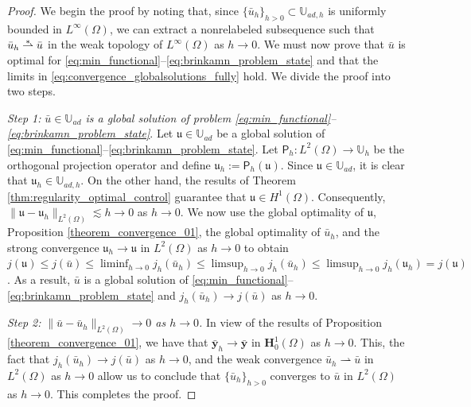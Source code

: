 \documentclass[final]{siamart0216}
\begin{document}
\begin{proof}
	We begin the proof by noting that, since $\{\bar{u}_{h}\}_{h>0}\subset \mathbb{U}_{ad,h}$ is uniformly bounded in $L^{\infty}(\Omega)$, we can extract a nonrelabeled subsequence such that $\bar{u}_{h}\mathrel{\ensurestackMath{\stackon[1pt]{\rightharpoonup}{\scriptstyle\ast}}}\bar{u}$ in the weak topology of $L^{\infty}(\Omega)$ as $h\rightarrow 0$. We must now prove that $\bar{u}$ is optimal for \eqref{eq:min_functional}--\eqref{eq:brinkamn_problem_state} and that the limits in \eqref{eq:convergence_globalsolutions_fully} hold. We divide the proof into two steps.
	
	\emph{Step 1:} \emph{$\bar{u}\in \mathbb{U}_{ad}$ is a global solution of problem \eqref{eq:min_functional}--\eqref{eq:brinkamn_problem_state}}. Let $\mathfrak{u}\in \mathbb{U}_{ad}$ be a global solution of \eqref{eq:min_functional}--\eqref{eq:brinkamn_problem_state}. Let $\mathsf{P}_h: L^2(\Omega)\to \mathbb{U}_h$ be the orthogonal projection operator and define $\mathfrak{u}_{h}:=\mathsf{P}_h(\mathfrak{u})$. Since $\mathfrak{u}\in \mathbb{U}_{ad}$, it is clear that $\mathfrak{u}_{h}\in \mathbb{U}_{ad,h}$. On the other hand, the results of Theorem \ref{thm:regularity_optimal_control} guarantee that 	$\mathfrak{u}\in H^1(\Omega)$. Consequently, $\|\mathfrak{u}-\mathfrak{u}_{h}\|_{L^2(\Omega)}\lesssim h \to 0$ as $h \rightarrow 0$. We now use the global optimality of $\mathfrak{u}$, Proposition \ref{theorem_convergence_01}, the global optimality of $\bar{u}_{h}$, and the strong convergence $\mathfrak{u}_{h}\to\mathfrak{u}$ in $L^2(\Omega)$ as $h \rightarrow 0$ to obtain $j(\mathfrak{u})\leq j(\bar{u})\leq \liminf_{h\to 0} j_h (\bar{u}_{h}) \leq \limsup_{h\to 0}j_h (\bar{u}_{h})\leq \limsup_{h \to 0}j_h (\mathfrak{u}_{h})=j(\mathfrak{u})$. As a result, $\bar{u}$ is a global solution of \eqref{eq:min_functional}--\eqref{eq:brinkamn_problem_state} and $j_h (\bar{u}_{h}) \rightarrow j(\bar{u})$ as $h \rightarrow 0$.

\emph{Step 2:} \emph{$\| \bar{u} - \bar{u}_h \|_{L^2(\Omega)}\to 0$ as $h \rightarrow 0$.} In view of the results of Proposition \ref{theorem_convergence_01}, we have that $\bar{\mathbf{y}}_h\to \bar{\mathbf{y}}$ in $\mathbf{H}_0^1(\Omega)$ as $h \rightarrow 0$. This, the fact that $j_h(\bar{u}_{h})\to j(\bar{u})$ as $h\rightarrow 0$, and the weak convergence $\bar{u}_{h}\rightharpoonup \bar{u}$ in $L^2(\Omega)$ as $h\rightarrow 0$ allow us to conclude that $\{\bar{u}_h\}_{h>0}$ converges to $\bar{u}$ in $L^2(\Omega)$ as $h\rightarrow 0$. This completes the proof.
\end{proof}
\end{document}
